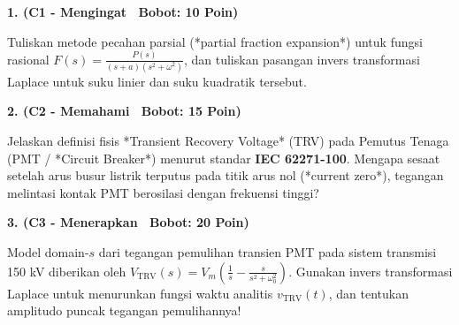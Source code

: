 \documentclass[10pt,a4paper]{article}
\begin{document}
\par
\vspace{1mm}

\noindent\textbf{1. (C1 - Mengingat \textbar\ Bobot: 10 Poin)}\par\vspace{0.8mm}
{\footnotesize Tuliskan metode pecahan parsial (*partial fraction expansion*) untuk fungsi rasional $F(s) = \frac{P(s)}{(s+a)(s^2 + \omega^2)}$, dan tuliskan pasangan invers transformasi Laplace untuk suku linier dan suku kuadratik tersebut.}\par

\vspace{2.5mm}

\noindent\textbf{2. (C2 - Memahami \textbar\ Bobot: 15 Poin)}\par\vspace{0.8mm}
{\footnotesize Jelaskan definisi fisis *Transient Recovery Voltage* (TRV) pada Pemutus Tenaga (PMT / *Circuit Breaker*) menurut standar \textbf{IEC 62271-100}. Mengapa sesaat setelah arus busur listrik terputus pada titik arus nol (*current zero*), tegangan melintasi kontak PMT berosilasi dengan frekuensi tinggi?}\par

\vspace{2.5mm}

\noindent\textbf{3. (C3 - Menerapkan \textbar\ Bobot: 20 Poin)}\par\vspace{0.8mm}
\noindent\begin{minipage}[t]{0.60\textwidth}%
  {\footnotesize Model domain-$s$ dari tegangan pemulihan transien PMT pada sistem transmisi 150 kV diberikan oleh $V_{\text{TRV}}(s) = V_m \left( \frac{1}{s} - \frac{s}{s^2 + \omega_0^2} \right)$. Gunakan invers transformasi Laplace untuk menurunkan fungsi waktu analitis $v_{\text{TRV}}(t)$, dan tentukan amplitudo puncak tegangan pemulihannya!}%
\end{minipage}%
\hfill%
\begin{minipage}[t]{0.37\textwidth}%
  \centering
\end{minipage}\par
\end{document}

